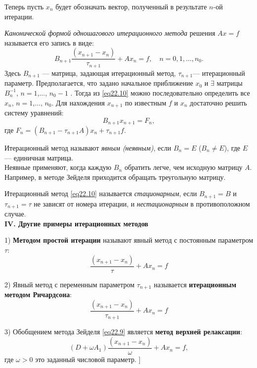 \par Теперь пусть $x_{n}$ будет обозначать вектор, полученный в результате $n$-ой итерации. 
\par {} \textit{Канонической формой одношагового итерационного метода} решения $Ax=f$ называется его запись в виде: 
\begin{equation} \label{eq22.10}
    B_{n+1}\frac{\left( x_{n+1}-x_{n}\right)}{\tau _{n+1}}+Ax_{n}=f, \quad n = 0, 1, \ldots, n_0.
\end{equation}
Здесь $B_{n+1}$ — матрица, задающая итерационный метод, $\tau _{n+1}$— итерационный параметр. Предполагается, что задано начальное приближение $x_{0}$ и $\exists$ матрицы $B_{n}^{-1}$, $n=1$,..., $n_{0}-1$ . Тогда из \eqref{eq22.10} можно последовательно определить все $x_{n}$, $n=1$,..., $n_{0}$. Для нахождения $x_{n+1}$ по известным $f$ и $x_{n}$ достаточно решить систему уравнений: 
$$B_{n+1}x_{n+1}=F_{n},$$ 
где $F_{n}=\left( B_{n+1}-\tau_{n+1}A\right)x_{n}+\tau_{n+1}f$. \\

\par {} Итерационный метод называют \textit{явным (неявным)}, если $B_{n}=E$
($B_{n}\neq E$), где $E$— единичная матрица. \\

Неявные применяют, когда каждую $B_{n}$ обратить легче, чем исходную матрицу $A$. Например, в методе Зейделя приходится обращать треугольную матрицу.\\

\par {} Итерационный метод \eqref{eq22.10} называется \textit{стационарным}, если $B_{n+1}=B$ и $\tau_{n+1}=\tau$ не зависят от номера итерации, и \textit{нестационарным} в противоположном случае.\\

\textbf{IV. Другие примеры итерационных методов}

\par 1) \textbf{Методом простой итерации} называют явный метод с постоянным параметром $\tau$:
$$\frac{\left( x_{n+1}-x_{n}\right)}{\tau}+Ax_{n}=f$$ 
\par 2) Явный метод с переменным параметром $\tau_{n+1}$ называется \textbf{итерационным методом Ричардсона}:
$$\frac{\left( x_{n+1}-x_{n}\right)}{\tau_{n+1}}+Ax_{n}=f$$ 
\par 3) Обобщением метода Зейделя \eqref{eq22.9} является \textbf{метод верхней релаксации}: 
$$\left( D+\omega A_{1}\right)\frac{\left( x_{n+1}-x_{n}\right)}{\omega}+Ax_n=f,$$ 
где $\omega>0$ это заданный числовой параметр.
\setcounter{equation}{0}
\bigbreak
[\cite[pages 82-85]{chm_samarski_gulin}]

